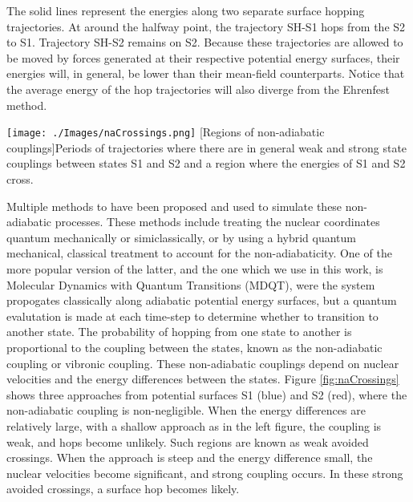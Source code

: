 The solid lines represent the energies along two separate surface hopping trajectories.
At around the halfway point, the trajectory SH-S1 hops from the S2 to S1.
Trajectory SH-S2 remains on S2.
Because these trajectories are allowed to be moved by forces generated at their respective potential energy surfaces, their energies will, in general, be lower than their mean-field counterparts.
Notice that the average energy of the hop trajectories will also diverge from the Ehrenfest method.

\noindent
\begin{minipage}[c]{\textwidth}
  \centering
  \texttt{[image: ./Images/naCrossings.png]}
  [Regions of non-adiabatic couplings]{Periods of trajectories where there are in general weak and strong state couplings between states S1 and S2 and a region where the energies of S1 and S2 cross.}
  \label{fig:naCrossings}
\end{minipage}\bigskip

Multiple methods to have been proposed and used to simulate these non-adiabatic processes.
These methods include treating the nuclear coordinates quantum mechanically or simiclassically, or by using a hybrid quantum mechanical, classical treatment to account for the non-adiabaticity.
One of the more popular version of the latter, and the one which we use in this work, is Molecular Dynamics with Quantum Transitions (MDQT), were the system propogates classically along adiabatic potential energy surfaces, but a quantum evalutation is made at each time-step to determine whether to transition to another state.
The probability of hopping from one state to another is proportional to the coupling between the states, known as the non-adiabatic coupling or vibronic coupling. These non-adiabatic couplings depend on nuclear velocities and the energy differences between the states. Figure \ref{fig:naCrossings} shows three approaches from potential surfaces S1 (blue) and S2 (red), where the non-adiabatic coupling is non-negligible. When the energy differences are relatively large, with a shallow approach as in the left figure, the coupling is weak, and hops become unlikely. Such regions are known as weak avoided crossings. When the approach is steep and the energy difference small, the nuclear velocities become significant, and strong coupling occurs. In these strong avoided crossings, a surface hop becomes likely.


